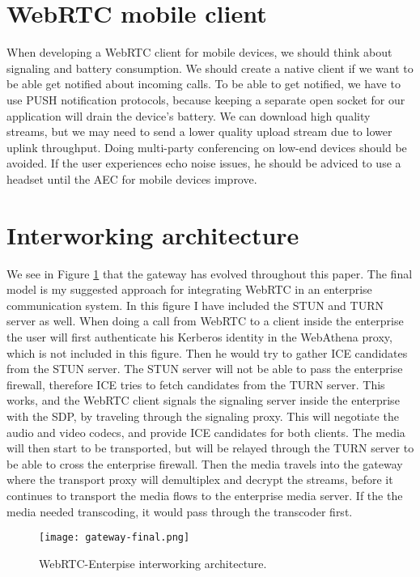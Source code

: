 \section{WebRTC mobile client}
When developing a WebRTC client for mobile devices, we should think about signaling and battery consumption. We should create a native client if we want to be able get notified about incoming calls. To be able to get notified, we have to use PUSH notification protocols, because keeping a separate open socket for our application will drain the device's battery. We can download high quality streams, but we may need to send a lower quality upload stream due to lower uplink throughput. Doing multi-party conferencing on low-end devices should be avoided. If the user experiences echo noise issues, he should be adviced to use a headset until the AEC for mobile devices improve.

\section{Interworking architecture}

We see in Figure \ref{fig:gateway-final} that the gateway has evolved throughout this paper. The final model is my suggested approach for integrating WebRTC in an enterprise communication system. In this figure I have included the STUN and TURN server as well. When doing a call from WebRTC to a client inside the enterprise the user will first authenticate his Kerberos identity in the WebAthena proxy, which is not included in this figure. Then he would try to gather ICE candidates from the STUN server. The STUN server will not be able to pass the enterprise firewall, therefore ICE tries to fetch candidates from the TURN server. This works, and the WebRTC client signals the signaling server inside the enterprise with the SDP, by traveling through the signaling proxy. This will negotiate the audio and video codecs, and provide ICE candidates for both clients. The media will then start to be transported, but will be relayed through the TURN server to be able to cross the enterprise firewall. Then the media travels into the gateway where the transport proxy will demultiplex and decrypt the streams, before it continues to transport the media flows to the enterprise media server. If the the media needed transcoding, it would pass through the transcoder first.
\\
\begin{figure}[here]
\centerline{\texttt{[image: gateway-final.png]}}
\caption{WebRTC-Enterpise interworking architecture.}
\label{fig:gateway-final}
\end{figure}


